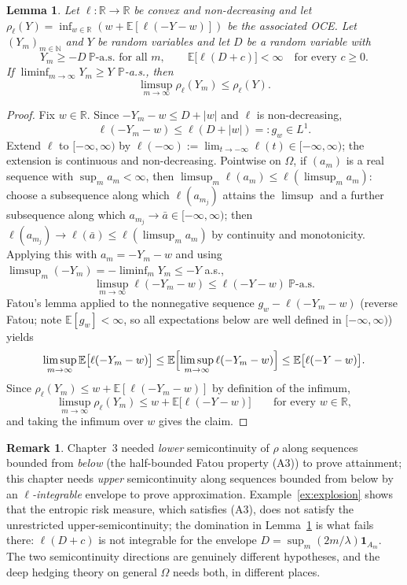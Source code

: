 \documentclass[11pt,a4paper]{report}
\numberwithin{equation}{chapter}
\theoremstyle{plain}
\newtheorem{lemma}[proposition]{Lemma}
\theoremstyle{definition}
\newtheorem{remark}[proposition]{Remark}
\newcommand{\E}{\mathbb{E}}
\newcommand{\PP}{\mathbb{P}}
\newcommand{\R}{\mathbb{R}}
\newcommand{\N}{\mathbb{N}}
\newcommand{\as}{\ \PP\text{-a.s.}}
\begin{document}
\begin{lemma}\label{lem:usc}
    Let $\ell\colon\R\to\R$ be convex and non-decreasing and let $\rho_\ell(Y)=\inf_{w\in\R}(w+\E[\ell(-Y-w)])$ be the associated OCE. Let $(Y_m)_{m\in\N}$ and $Y$ be random variables and let $D$ be a random variable with
    \[
        Y_m\ge-D\as\text{ for all }m,\qquad
        \E\bigl[\ell(D+c)\bigr]<\infty\quad\text{for every }c\ge0.
    \]
    If $\liminf_{m\to\infty}Y_m\ge Y$ $\PP$-a.s., then
    \[
        \limsup_{m\to\infty}\rho_\ell(Y_m)\le\rho_\ell(Y).
    \]
\end{lemma}

\begin{proof}
    Fix $w\in\R$. Since $-Y_m-w\le D+|w|$ and $\ell$ is non-decreasing,
    \[
        \ell(-Y_m-w)\le\ell(D+|w|)=:g_w\in L^1.
    \]
    Extend $\ell$ to $[-\infty,\infty)$ by $\ell(-\infty):=\lim_{t\to-\infty}\ell(t)\in[-\infty,\infty)$; the extension is continuous and non-decreasing. Pointwise on $\Omega$, if $(a_m)$ is a real sequence with $\sup_m a_m<\infty$, then $\limsup_m\ell(a_m)\le\ell(\limsup_m a_m)$: choose a subsequence along which $\ell(a_{m_j})$ attains the $\limsup$ and a further subsequence along which $a_{m_j}\to\bar a\in[-\infty,\infty)$; then $\ell(a_{m_j})\to\ell(\bar a)\le\ell(\limsup_m a_m)$ by continuity and monotonicity. Applying this with $a_m=-Y_m-w$ and using $\limsup_m(-Y_m)=-\liminf_m Y_m\le-Y$ a.s.,
    \[
        \limsup_{m\to\infty}\ell(-Y_m-w)\le\ell(-Y-w)\as
    \]
    Fatou's lemma applied to the nonnegative sequence $g_w-\ell(-Y_m-w)$ (reverse Fatou; note $\E[g_w]<\infty$, so all expectations below are well defined in $[-\infty,\infty)$) yields
    \[
        \limsup_{m\to\infty}\E\bigl[\ell(-Y_m-w)\bigr]\le\E\Bigl[\limsup_{m\to\infty}\ell(-Y_m-w)\Bigr]\le\E\bigl[\ell(-Y-w)\bigr].
    \]
    Since $\rho_\ell(Y_m)\le w+\E[\ell(-Y_m-w)]$ by definition of the infimum,
    \[
        \limsup_{m\to\infty}\rho_\ell(Y_m)\le w+\E\bigl[\ell(-Y-w)\bigr]\qquad\text{for every }w\in\R,
    \]
    and taking the infimum over $w$ gives the claim.
\end{proof}

\begin{remark}\label{rem:two-directions}
    Chapter~3 needed \emph{lower} semicontinuity of $\rho$ along sequences bounded from \emph{below} (the half-bounded Fatou property (A3)) to prove attainment; this chapter needs \emph{upper} semicontinuity along sequences bounded from below by an \emph{$\ell$-integrable} envelope to prove approximation. Example~\ref{ex:explosion} shows that the entropic risk measure, which satisfies (A3), does not satisfy the unrestricted upper-semicontinuity; the domination in Lemma~\ref{lem:usc} is what fails there: $\ell(D+c)$ is not integrable for the envelope $D=\sup_m(2m/\lambda)\mathbf{1}_{A_m}$. The two semicontinuity directions are genuinely different hypotheses, and the deep hedging theory on general $\Omega$ needs both, in different places.
\end{remark}
\end{document}
